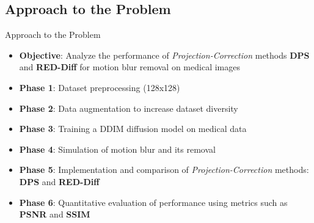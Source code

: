 \subsection{Approach to the Problem}
\begin{frame}{Approach to the Problem}
  \begin{itemize}
    \item \textbf{Objective}: Analyze the performance of \textit{Projection-Correction} methods \textbf{DPS} and \textbf{RED-Diff} for motion blur removal on medical images
    \item \textbf{Phase 1}: Dataset preprocessing (128x128)
    \item \textbf{Phase 2}: Data augmentation to increase dataset diversity
    \item \textbf{Phase 3}: Training a DDIM diffusion model on medical data
    \item \textbf{Phase 4}: Simulation of motion blur and its removal
    \item \textbf{Phase 5}: Implementation and comparison of \textit{Projection-Correction} methods: \textbf{DPS} and \textbf{RED-Diff}
    \item \textbf{Phase 6}: Quantitative evaluation of performance using metrics such as \textbf{PSNR} and \textbf{SSIM}
  \end{itemize}
\end{frame}